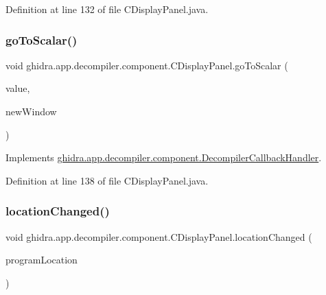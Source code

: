 Definition at line 132 of file C\+Display\+Panel.\+java.

\mbox{\label{classghidra_1_1app_1_1decompiler_1_1component_1_1_c_display_panel_a2f5663eed9340a3ff8cd5ece980d8bb2}} 
\subsubsection{\texorpdfstring{goToScalar()}{goToScalar()}}
{\footnotesize\ttfamily void ghidra.\+app.\+decompiler.\+component.\+C\+Display\+Panel.\+go\+To\+Scalar (\begin{DoxyParamCaption}\item[{long}]{value,  }\item[{boolean}]{new\+Window }\end{DoxyParamCaption})\hspace{0.3cm}{\ttfamily [inline]}}



Implements \mbox{\hyperlink{interfaceghidra_1_1app_1_1decompiler_1_1component_1_1_decompiler_callback_handler_a32303b61cd68fd57ce7e33a2973f9372}{ghidra.\+app.\+decompiler.\+component.\+Decompiler\+Callback\+Handler}}.



Definition at line 138 of file C\+Display\+Panel.\+java.

\mbox{\label{classghidra_1_1app_1_1decompiler_1_1component_1_1_c_display_panel_a7f57fbf9d9615e6d475813776462beac}} 
\subsubsection{\texorpdfstring{locationChanged()}{locationChanged()}}
{\footnotesize\ttfamily void ghidra.\+app.\+decompiler.\+component.\+C\+Display\+Panel.\+location\+Changed (\begin{DoxyParamCaption}\item[{Program\+Location}]{program\+Location }\end{DoxyParamCaption})\hspace{0.3cm}{\ttfamily [inline]}}



